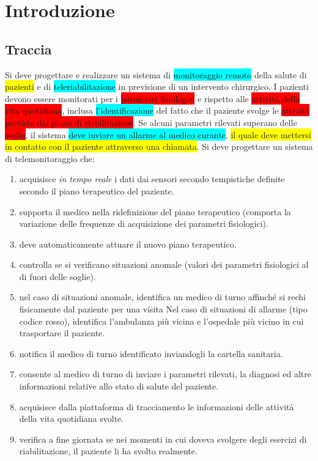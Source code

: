 \documentclass[a4paper,11pt,oneside, table]{article}
\begin{document}
    \printindex
    \tableofcontents
    \renewcommand{\baselinestretch}{1.5}

\section{Introduzione}

\subsection{Traccia}

Si deve progettare e realizzare un sistema di \colorbox{cyan}{monitoraggio remoto} della salute di \colorbox{yellow}{pazienti} e di \colorbox{cyan}{teleriabilitazione} in previsione di un intervento chirurgico.
I pazienti devono essere monitorati per i \colorbox{red}{parametri fisiologici} e rispetto alle \colorbox{red}{attività della vita quotidiana}, inclusa \colorbox{cyan}{l'identificazione} del fatto che il paziente svolge le \colorbox{red}{attività previste dal piano di riabilitazione}.
Se alcuni parametri rilevati superano delle \colorbox{red}{soglie}, il sistema \colorbox{cyan}{deve inviare un allarme al medico curante}, \colorbox{yellow}{il quale deve mettersi in contatto con il paziente attraverso una chiamata}.
Si deve progettare un sistema di telemonitoraggio che:

\begin{enumerate}
  \item acquisisce \textit{in tempo reale} i dati dai sensori secondo tempistiche definite secondo il piano terapeutico del paziente.
  \item supporta il medico nella ridefinizione del piano terapeutico (comporta la variazione delle frequenze di acquisizione dei parametri fisiologici).
  \item deve automaticamente attuare il nuovo piano terapeutico.
  \item controlla se si verificano situazioni anomale (valori dei parametri fisiologici al di fuori delle soglie).
  \item nel caso di situazioni anomale, identifica un medico di turno affinché si rechi fisicamente dal paziente per una visita Nel caso di situazioni di allarme (tipo codice rosso), identifica l'ambulanza pi\`u vicina e l'ospedale pi\`u vicino in cui trasportare il paziente.
  \item notifica il medico di turno identificato inviandogli la cartella sanitaria.
  \item consente al medico di turno di inviare i parametri rilevati, la diagnosi ed altre informazioni relative allo stato di salute del paziente.
  \item acquisisce dalla piattaforma di tracciamento le informazioni delle attività della vita quotidiana svolte.
  \item verifica a fine giornata se nei momenti in cui doveva svolgere degli esercizi di riabilitazione, il paziente li ha svolto realmente.
\end{enumerate}
\end{document}

